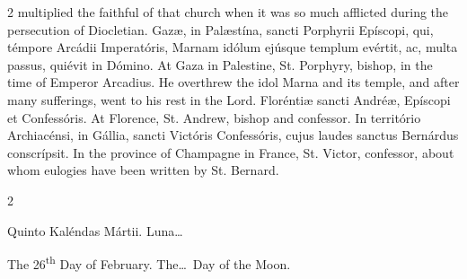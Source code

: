 \begin{paracol}{2}
 multiplied the faithful of that church when it was so much afflicted during 
 the persecution of Diocletian.
\switchcolumn*
{}
Gazæ, in Palæstína, sancti Porphyrii Epíscopi, 
 qui, témpore Arcádii Imperatóris, Marnam idólum ejúsque templum evértit, ac, 
 multa passus, quiévit in Dómino.
\switchcolumn
{}
At Gaza in Palestine, St. Porphyry, bishop, in the time of Emperor Arcadius. 
 He overthrew the idol Marna and its temple, and after many sufferings, went 
 to his rest in the Lord.
\switchcolumn*
{}
Floréntiæ sancti Andréæ, Epíscopi et 
 Confessóris.
\switchcolumn
{}
At Florence, St. Andrew, bishop and confessor.
\switchcolumn*
{}
In território Archiacénsi, in Gállia, sancti Victóris Confessóris, cujus 
 laudes sanctus Bernárdus conscrípsit.
\switchcolumn
{}
In the province of Champagne in France, St. Victor, confessor, about whom 
 eulogies have been written by St. Bernard.
\switchcolumn*
{}
\end{paracol}


\begin{paracol}{2}
\begin{center}{\color{gregoriocolor} Quinto Kaléndas Mártii. 
 Luna\dots\ }\end{center}
\switchcolumn
{}
\begin{center}{\color{gregoriocolor} The 26\textsuperscript{th} Day of February. The\dots\ Day of the Moon.}\end{center}
\end{paracol}

